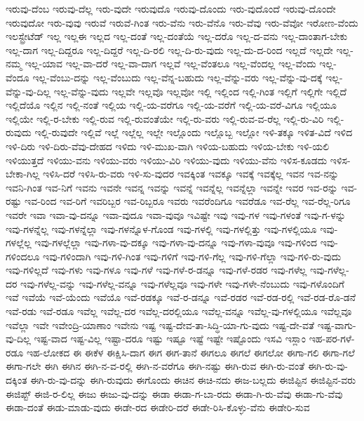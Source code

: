 {ಇರುವು-ದೆಂಬ
ಇರುವು-ದೆಲ್ಲ
ಇರು-ವುದೇ
ಇರುವುದೊ
ಇರುವು-ದೊಂದು
ಇರು-ವುದೊಂದೆ
ಇರುವು-ದೊಂದೇ
ಇರುವುದೋ
ಇರು-ವುವು
ಇರುವೆ
ಇರುವೆ-ಗಿಂತ
ಇರು-ವೆನು
ಇರು-ವೆನೊ
ಇರು-ವೆವು
ಇರು-ವೆವೋ
ಇರೋಣ-ವೆಂದು
ಇಲಸ್ಟ್ರೇಟೆಡ್
ಇಲ್ಲ
ಇಲ್ಲಈ
ಇಲ್ಲದ
ಇಲ್ಲ-ದಂತೆ
ಇಲ್ಲ-ದಂತೆಯೆ
ಇಲ್ಲ-ದರೊ
ಇಲ್ಲ-ದ-ವನು
ಇಲ್ಲ-ದಾಂತಾಗ-ಬೇಕು
ಇಲ್ಲ-ದಾಗ
ಇಲ್ಲ-ದಿದ್ದರೂ
ಇಲ್ಲ-ದಿದ್ದರೆ
ಇಲ್ಲ-ದಿ-ರಲಿ
ಇಲ್ಲ-ದಿ-ರು-ವುದು
ಇಲ್ಲ-ದು-ದ-ರಿಂದ
ಇಲ್ಲದೆ
ಇಲ್ಲದೇ
ಇಲ್ಲ-ನಮ್ಮ
ಇಲ್ಲ-ಯಾವ
ಇಲ್ಲ-ವಾ-ದರೆ
ಇಲ್ಲ-ವಾ-ದಾಗ
ಇಲ್ಲವೆ
ಇಲ್ಲ-ವೆಂತಲೂ
ಇಲ್ಲ-ವೆಂದಲ್ಲ
ಇಲ್ಲ-ವೆಂದು
ಇಲ್ಲ-ವೆಂದೂ
ಇಲ್ಲ-ವೆಂಬು-ದನ್ನು
ಇಲ್ಲ-ವೆಂಬುದು
ಇಲ್ಲ-ವೆನ್ನ-ಬಹುದು
ಇಲ್ಲ-ವೆನ್ನು-ವರು
ಇಲ್ಲ-ವೆನ್ನು-ವು-ದಕ್ಕೆ
ಇಲ್ಲ-ವೆನ್ನು-ವು-ದಿಲ್ಲ
ಇಲ್ಲ-ವೆನ್ನು-ವುದು
ಇಲ್ಲವೇ
ಇಲ್ಲವೊ
ಇಲ್ಲವೋ
ಇಲ್ಲಿ
ಇಲ್ಲಿಂದ
ಇಲ್ಲಿ-ಗಿಂತ
ಇಲ್ಲಿಗೆ
ಇಲ್ಲಿಗೇ
ಇಲ್ಲಿದೆ
ಇಲ್ಲಿದೆಯೊ
ಇಲ್ಲಿನ
ಇಲ್ಲಿ-ನಂತೆ
ಇಲ್ಲಿಯ
ಇಲ್ಲಿ-ಯ-ವರೆಗೂ
ಇಲ್ಲಿ-ಯ-ವರೆಗೆ
ಇಲ್ಲಿ-ಯ-ವರೆ-ವಿಗೂ
ಇಲ್ಲಿಯೂ
ಇಲ್ಲಿಯೇ
ಇಲ್ಲಿ-ರ-ಬೇಕು
ಇಲ್ಲಿ-ರುವ
ಇಲ್ಲಿ-ರುವಂತೆಯೇ
ಇಲ್ಲಿ-ರು-ವರು
ಇಲ್ಲಿ-ರುವ-ವ-ರೆಲ್ಲ
ಇಲ್ಲಿ-ರು-ವಿರಿ
ಇಲ್ಲಿ-ರುವುದು
ಇಲ್ಲಿ-ರುವುದೇ
ಇಲ್ಲಿವೆ
ಇಲ್ಲೆ
ಇಲ್ಲೆಲ್ಲ
ಇಲ್ಲೇ
ಇಲ್ಲೊಂದು
ಇಲ್ಲೊಬ್ಬ
ಇಲ್ಲೋ
ಇಳಿ-ತಕ್ಕೂ
ಇಳಿತ-ವಿದೆ
ಇಳಿದ
ಇಳಿ-ದಿರು
ಇಳಿ-ದಿರು-ವೆವು-ದೇಹದ
ಇಳಿದು
ಇಳಿ-ಮುಖ-ವಾಗಿ
ಇಳಿಯ-ಬಹುದು
ಇಳಿಯ-ಬೇಕು
ಇಳಿ-ಯಲಿ
ಇಳಿಯುತ್ತದೆ
ಇಳಿಯು-ವನು
ಇಳಿಯು-ವರು
ಇಳಿಯು-ವಿರಿ
ಇಳಿಯು-ವುದು
ಇಳಿಯು-ವೆನು
ಇಳಿಸ-ಕೂಡದು
ಇಳಿಸ-ಬೇಕಾ-ಗಿಲ್ಲ
ಇಳಿಸಿ-ದರೆ
ಇಳಿಸಿ-ರು-ವರು
ಇಳಿ-ಸು-ವುದರ
ಇವಕ್ಕಿಂತ
ಇವಕ್ಕೂ
ಇವಕ್ಕೆ
ಇವಕ್ಕೆಲ್ಲ
ಇವನ
ಇವ-ನನ್ನು
ಇವನಿ-ಗಿಂತ
ಇವ-ನಿಗೆ
ಇವನು
ಇವನೇ
ಇವನ್ನ
ಇವನ್ನು
ಇವನ್ನೆ
ಇವನ್ನೆಲ್ಲ
ಇವನ್ನೆಲ್ಲಾ
ಇವನ್ನೇ
ಇವರ
ಇವ-ರನ್ನು
ಇವ-ರಷ್ಟು
ಇವ-ರಿಂದ
ಇವ-ರಿಗೆ
ಇವರಿಬ್ಬರ
ಇವ-ರಿಬ್ಬರೂ
ಇವರು
ಇವರೆಂದಿಗೂ
ಇವರೆಡೂ
ಇವ-ರೆಲ್ಲ
ಇವ-ರೆಲ್ಲ-ರಿಗೂ
ಇವರೇ
ಇವಾ
ಇವಾ-ವು-ದನ್ನೂ
ಇವಾ-ವುದೂ
ಇವಾ-ವುವೂ
ಇವಿಷ್ಟೇ
ಇವು
ಇವು-ಗಳ
ಇವು-ಗಳಂತೆ
ಇವು-ಗ-ಳನ್ನು
ಇವು-ಗಳನ್ನೆಲ್ಲ
ಇವು-ಗಳನ್ನೆಲ್ಲಾ
ಇವು-ಗಳನ್ನೊಳ-ಗೊಂಡ
ಇವು-ಗಳಲ್ಲಿ
ಇವು-ಗಳಲ್ಲಿತ್ತು
ಇವು-ಗಳಲ್ಲಿಯೂ
ಇವು-ಗಳಲ್ಲೆಲ್ಲ
ಇವು-ಗಳಲ್ಲೆಲ್ಲಾ
ಇವು-ಗಳಾ-ವು-ದಕ್ಕೂ
ಇವು-ಗಳಾ-ವು-ದನ್ನೂ
ಇವು-ಗಳಾ-ವುವೂ
ಇವು-ಗಳಿಂದ
ಇವು-ಗಳಿಂದಲೂ
ಇವು-ಗಳಿಂದಾಗಿ
ಇವು-ಗಳಿ-ಗಿಂತ
ಇವು-ಗಳಿಗೆ
ಇವು-ಗಳಿ-ಗೆಲ್ಲ
ಇವು-ಗಳಿ-ಗೆಲ್ಲಾ
ಇವು-ಗಳಿ-ರು-ವುದು
ಇವು-ಗಳಿಲ್ಲದೆ
ಇವು-ಗಳು
ಇವು-ಗಳೂ
ಇವು-ಗಳೆ
ಇವು-ಗಳೆ-ರ-ಡನ್ನೂ
ಇವು-ಗಳೆ-ರಡರ
ಇವು-ಗಳೆಲ್ಲ
ಇವು-ಗಳೆಲ್ಲ-ದರ
ಇವು-ಗಳೆಲ್ಲ-ವನ್ನು
ಇವು-ಗಳೆಲ್ಲ-ವನ್ನೂ
ಇವು-ಗಳೆಲ್ಲವೂ
ಇವು-ಗಳೇ
ಇವು-ಗಳೇ-ನೆಂಬುದು
ಇವು-ಗಳೊಂದಿಗೆ
ಇವೆ
ಇವೆಯೆ
ಇವೆ-ಯೆಂದು
ಇವೆಯೊ
ಇವೆ-ರಡಕ್ಕೂ
ಇವೆ-ರ-ಡನ್ನೂ
ಇವೆ-ರಡರ
ಇವೆ-ರಡ-ರಲ್ಲಿ
ಇವೆ-ರಡ-ರೊ-ಡನೆ
ಇವೆ-ರಡು
ಇವೆ-ರಡೂ
ಇವೆಲ್ಲ
ಇವೆಲ್ಲ-ದರ
ಇವೆಲ್ಲ-ದರಲ್ಲಿಯೂ
ಇವೆಲ್ಲ-ವನ್ನೂ
ಇವೆಲ್ಲ-ವು-ಗಳಲ್ಲಿಯೂ
ಇವೆಲ್ಲವೂ
ಇವೆಲ್ಲಾ
ಇವೇ
ಇವೇಂದ್ರಿ-ಯಾಣಾಂ
ಇವೇನು
ಇಷ್ಟ
ಇಷ್ಟ-ದೇವ-ತಾ-ಸಿದ್ಧಿ-ಯಾ-ಗು-ವುದು
ಇಷ್ಟ-ದೇ-ವತೆ
ಇಷ್ಟ-ವಾಗು-ವು-ದಿಲ್ಲ
ಇಷ್ಟ-ವಾದ
ಇಷ್ಟ-ವಿಲ್ಲ
ಇಷ್ಟಾ-ದರೂ
ಇಷ್ಟು
ಇಷ್ಟೂ
ಇಷ್ಟೆ
ಇಷ್ಟೇ
ಇಷ್ಟೊಂದು
ಇಸವಿ
ಇಸ್ಲಾಂ
ಇಹ-ಪರ-ಗಳೆ-ರಡೂ
ಇಹ-ಲೋಕದ
ಈ
ಈಕೆಳ
ಈಕ್ಷಿಸಿ-ದಾಗ
ಈಗ
ಈಗ-ತಾನೆ
ಈಗಲೂ
ಈಗಲೆ
ಈಗಲೋ
ಈಗಾ-ಗಲಿ
ಈಗಾ-ಗಲೆ
ಈಗಾ-ಗಲೇ
ಈಗಿ
ಈಗಿನ
ಈಗಿ-ನ-ವ-ರಲ್ಲಿ
ಈಗಿ-ನ-ವರೆಗೂ
ಈಗಿ-ನಷ್ಟು
ಈಗಿ-ರುವ
ಈಗಿ-ರು-ವಂತೆ
ಈಗಿ-ರು-ವು-ದಕ್ಕಿಂತ
ಈಗಿ-ರು-ವು-ದನ್ನು
ಈಗಿ-ರುವುದು
ಈಗೊಂದು
ಈಚಿನ
ಈಚಿ-ನದು
ಈಜ-ಬಲ್ಲದು
ಈಜಿಪ್ಟಿನ
ಈಜಿಪ್ಟಿನ-ವರು
ಈಜಿಪ್ಟ್
ಈಜಿ-ರ-ಲಿಲ್ಲ
ಈಜು
ಈಜು-ವು-ದನ್ನು
ಈಡಾ
ಈಡಾ-ಗ-ಬಾ-ರದು
ಈಡಾ-ಗಿ-ರು-ವೆವು
ಈಡಾ-ಗು-ವೆವು
ಈಡಾ-ದಂತೆ
ಈಡು-ಮಾಡು-ವುದು
ಈಡೇ-ರದ
ಈಡೇರಿ-ದರೆ
ಈಡೇ-ರಿಸಿ-ಕೊಳ್ಳು-ವೆನು
ಈಡೇರಿ-ಸುವ
}
